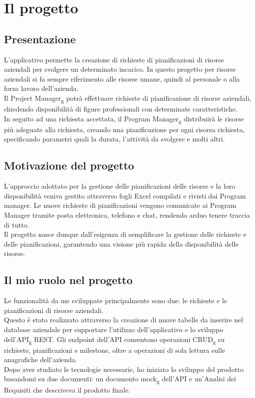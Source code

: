 \section{Il progetto}
\subsection{Presentazione}
L'applicativo permette la creazione di richieste di pianificazioni di risorse aziendali per svolgere un determinato incarico. In questo progetto per risorse aziendali si fa sempre riferimento alle risorse umane, quindi al personale o alla forza lavoro dell'azienda.\\
Il Project Manager\textsubscript{g} potrà effettuare richieste di pianificazione di risorse aziendali, chiedendo disponibilità di figure professionali con determinate caratteristiche.\\ 
In seguito ad una richiesta accettata, il Program Manager\textsubscript{g} distribuirà le risorse più adeguate alla richiesta, creando una pianificazione per ogni risorsa richiesta, specificando parametri quali la durata, l'attività da svolgere e molti altri.\\

\subsection{Motivazione del progetto}
L'approccio adottato per la gestione delle pianificazioni delle risorse e la loro disponibilità veniva gestito attraverso fogli Excel compilati e rivisti dai Program manager. Le nuove richieste di pianificazioni vengono comunicate ai Program Manager tramite posta elettronica, telefono e chat, rendendo arduo tenere traccia di tutto.\\
Il progetto nasce dunque dall’esigenza di semplificare la gestione delle richieste e delle pianificazioni, garantendo una visione più rapida della disponibilità delle risorse.\\

\subsection{Il mio ruolo nel progetto}
Le funzionalità da me sviluppate principalmente sono due: le richieste e le pianificazioni di risorse aziendali.\\
Questo è stato realizzato attraverso la creazione di nuove tabelle da inserire nel database aziendale per supportare l'utilizzo dell'applicativo e lo sviluppo dell'API\textsubscript{g} REST. Gli endpoint dell'API consentono operazioni CRUD\textsubscript{g} su richieste, pianificazioni e milestone, oltre a operazioni di sola lettura sulle anagrafiche dell'azienda.\\
Dopo aver studiato le tecnologie necessarie, ho iniziato lo sviluppo del prodotto basandomi su due documenti: un documento mock\textsubscript{g} dell'API e un'Analisi dei Requisiti che descriveva il prodotto finale.


